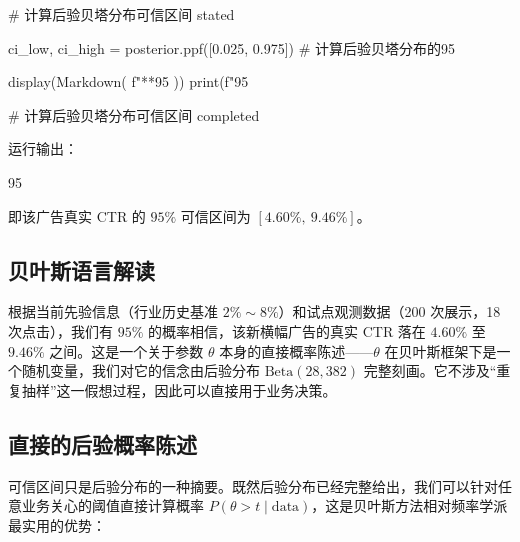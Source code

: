 \documentclass[12pt,a4paper,UTF8,fontset=none]{ctexart}
\newcommand{\tht}{\theta}
\begin{document}
\begin{pycode}
# 计算后验贝塔分布可信区间 stated

ci_low, ci_high = posterior.ppf([0.025, 0.975])    # 计算后验贝塔分布的95%

display(Markdown(
    f"**95%
))
print(f"95%

# 计算后验贝塔分布可信区间 completed
\end{pycode}

运行输出：

\begin{runout}
95%
\end{runout}

即该广告真实 CTR 的 $95\%$ 可信区间为 $[4.60\%,\ 9.46\%]$。

\subsection{贝叶斯语言解读}

根据当前先验信息（行业历史基准 $2\%\sim8\%$）和试点观测数据（200 次展示，18 次点击），我们有 $95\%$ 的概率相信，该新横幅广告的真实 CTR 落在 $4.60\%$ 至 $9.46\%$ 之间。这是一个关于参数 $\tht$ 本身的直接概率陈述——$\tht$ 在贝叶斯框架下是一个随机变量，我们对它的信念由后验分布 $\mathrm{Beta}(28,382)$ 完整刻画。它不涉及“重复抽样”这一假想过程，因此可以直接用于业务决策。

\subsection{直接的后验概率陈述}

可信区间只是后验分布的一种摘要。既然后验分布已经完整给出，我们可以针对任意业务关心的阈值直接计算概率 $P(\tht>t\mid\text{data})$，这是贝叶斯方法相对频率学派最实用的优势：

\end{document}
